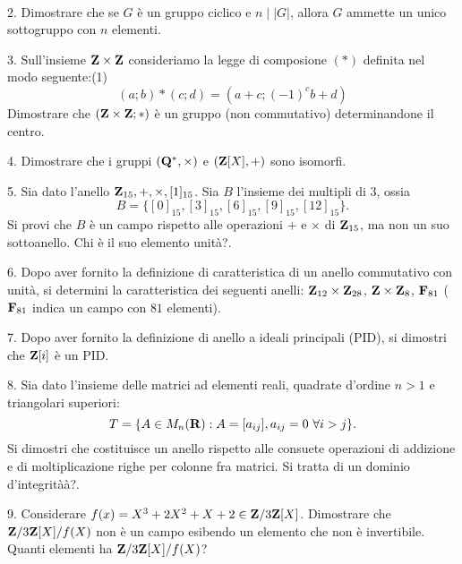 \ \dotfill\ \bigskip\bigskip\bigskip


\vfil\eject

\item{2.} Dimostrare che se $G$ \`e un gruppo ciclico e $n\mid |G|$, allora $G$ ammette un unico 
sottogruppo con $n$ elementi.\vv

\item{3.} Sull'insieme ${\bf Z}\times{\bf Z}$ consideriamo la legge di composione $(*)$ definita nel modo seguente:(1)
$$(a; b) * (c; d) = (a + c; (-1)^c b + d)$$
Dimostrare che $({\bf Z}\times{\bf Z};*)$ \`e un gruppo (non commutativo) determinandone il centro.\ve\vs

\item{4.} Dimostrare che i gruppi $({\bf Q}^*,\times)$ e $({\bf Z}[X],+)$ sono isomorfi.\vv

\item{5.} Sia dato l’anello ${\bf Z}_{15}, +, \times,[1]_{15}$. Sia $B$ l’insieme dei multipli di
$3$, ossia
$$B =\{ [0]_{15}, [3]_{15}, [6]_{15}, [9]_{15}, [12]_{15}\}.$$ 
Si provi che $B$ è un campo rispetto alle
operazioni $+$ e $\times$ di ${\bf Z}_{15}$, ma non un suo sottoanello. 
Chi è il suo elemento unit\`a?.\ve\vs

\item{6.} Dopo aver fornito la definizione di caratteristica di un anello commutativo con unit\`a, si determini la
caratteristica dei seguenti anelli: ${\bf Z}_{12}\times{\bf Z}_{28}$, ${\bf Z}\times{\bf Z}_{8}$, ${\bf F}_{81}$ (${\bf F}_{81}$
indica un campo con $81$ elementi).\vv

\item{7.} Dopo aver fornito la definizione di anello a ideali principali (PID), si dimostri che
${\bf Z}[i]$ \`e un PID.\vv

\item{8.} Sia dato l’insieme delle matrici ad elementi reali, quadrate d’ordine $n > 1$
e triangolari superiori:
$$T = \{A \in M_n({\bf R}): A = [a_{ij}], a_{ij} = 0\  \forall i > j\}.$$
 Si dimostri che costituisce un anello rispetto alle consuete operazioni di
addizione e di moltiplicazione righe per colonne fra matrici.
 Si tratta di un dominio d'integrità\`a?.
\ve \vs
 \bye

\item{9.} Considerare $f(x)=X^3+2X^2+X+2\in{\bf Z}/3{\bf Z}[X]$. Dimostrare che ${\bf Z}/3{\bf Z}[X]/f(X)$
non \`e un campo esibendo un elemento che non \`e invertibile. Quanti elementi ha ${\bf Z}/3{\bf Z}[X]/f(X)$?
\ \vst
